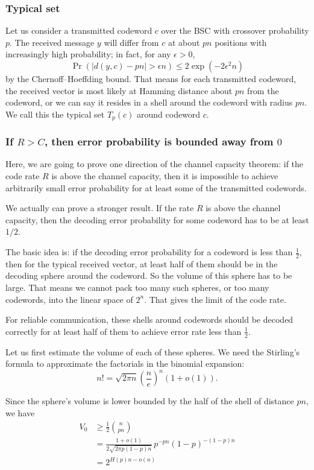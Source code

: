 \subsubsection{Typical set}\label{sec:typical}
Let us consider a transmitted codeword \(c\) over the BSC with crossover probability \(p\). The received message \(y\) will differ from \(c\) at about \(pn\) positions with increasingly high probability; in fact, for any \(\epsilon > 0\),
\[\Pr\left(|d(y, c) - pn| > \epsilon n\right) \leq 2\exp( - 2\epsilon^2 n) \]
by the Chernoff--Hoeffding bound. That means for each transmitted codeword, the received vector is most likely at Hamming distance about \(pn\) from the codeword, or we can say it resides in a shell around the codeword with radius \(pn\).  We call this the typical set \(T_{p}(c)\) around codeword \(c\).

\subsubsection{If \(R > C\), then error probability is bounded away from \(0\)}
Here, we are going to prove one direction of the channel capacity theorem: if the code rate \(R\) is above the channel capacity, then it is impossible to achieve arbitrarily small error probability for at least some of the transmitted codewords. 

We actually can prove a stronger result. If the rate \(R\) is above the channel capacity, then the decoding error probability for some codeword has to be at least \(1/2\). 

The basic idea is: if the decoding error probability for a codeword is less than \(\frac{1}{2}\), then for the typical received vector, at least half of them should be in the decoding sphere around the codeword. So the volume of this sphere has to be large. That means we cannot pack too many such spheres, or too many codewords, into the linear space of \(2^n\). That gives the limit of the code rate.    



For reliable communication, these shells around codewords should be decoded correctly for at least half of them to achieve error rate less than \(\frac{1}{2}\).  


Let us first estimate the volume of each of these spheres. We need the Stirling's formula to approximate the factorials in the binomial expansion:  
\[n! = \sqrt{2\pi n} (\frac{n}{e})^n (1 + o(1)).\]

Since the sphere's volume is lower bounded by the half of the shell of distance \(pn\), we have
\begin{align*}
V_0 &\geq \frac{1}{2} \binom{n}{pn} \\
    &= \frac{1 + o(1)}{2\sqrt{2\pi p(1-p) n}}\, p^{-pn}(1-p)^{-(1-p)n} \\
    &= 2^{H(p)n - o(n)}
\end{align*}

